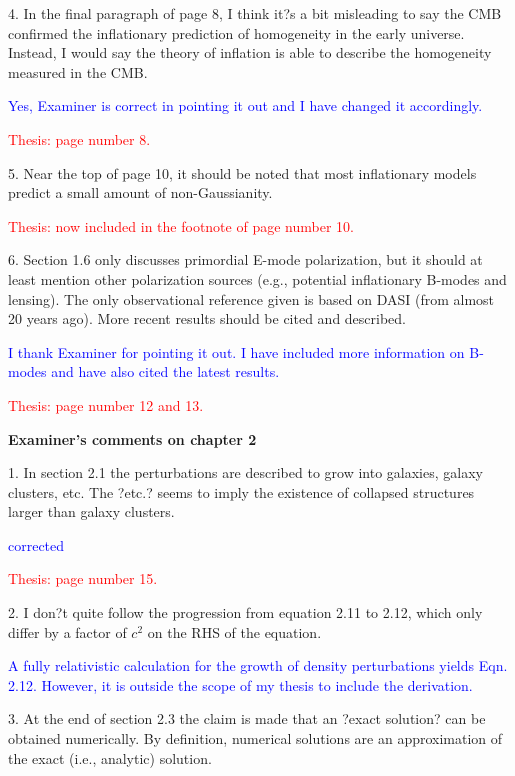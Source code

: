 \documentclass[11pt,a4paper]{article}
\begin{document}
4. In the final paragraph of page 8, I think it?s a bit misleading to say the CMB
confirmed the inflationary prediction of homogeneity in the early universe.
Instead, I would say the theory of inflation is able to describe the homogeneity
measured in the CMB.

\textcolor{blue}{Yes, Examiner is correct in pointing it out and I have changed it accordingly.}

\textcolor{red}{Thesis: page number 8.}

5. Near the top of page 10, it should be noted that most inflationary models predict
a small amount of non-Gaussianity.

\textcolor{red}{Thesis: now included in the footnote of page number 10.}

6.  Section 1.6 only discusses primordial E-mode polarization, but it should at least
mention other polarization sources (e.g., potential inflationary B-modes and
lensing). The only observational reference given is based on DASI (from almost
20 years ago). More recent results should be cited and described.

\textcolor{blue}{I thank Examiner for pointing it out. I have included more information on B-modes and have also cited the latest results.}

\textcolor{red}{Thesis: page number 12 and 13.}


\begin{center}
\textbf{Examiner's comments on chapter 2}
\end{center}

1. In section 2.1 the perturbations are described to grow into galaxies, galaxy
clusters, etc. The ?etc.? seems to imply the existence of collapsed structures
larger than galaxy clusters.

\textcolor{blue}{corrected}

\textcolor{red}{Thesis: page number 15.}

2. I don?t quite follow the progression from equation 2.11 to 2.12, which only differ
by a factor of $c^2$ on the RHS of the equation.

\textcolor{blue}{A fully relativistic calculation for the growth of density perturbations yields Eqn. 2.12. However, it is outside the scope of my thesis to include the derivation.}

3. At the end of section 2.3 the claim is made that an ?exact solution? can be
obtained numerically. By definition, numerical solutions are an approximation of
the exact (i.e., analytic) solution.
\end{document}

